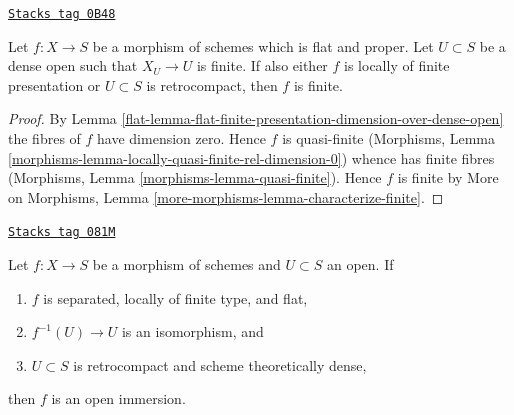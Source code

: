 \begin{lemma}
\label{flat-lemma-proper-flat-finite-over-dense-open}
\href{https://stacks.math.columbia.edu/tag/0B48}{\texttt{Stacks tag 0B48}}

Let $f : X \to S$ be a morphism of schemes which is flat and proper.
Let $U \subset S$ be a dense open such that $X_U \to U$ is finite.
If also either $f$ is locally of finite presentation or
$U \subset S$ is retrocompact, then $f$ is finite.
\end{lemma}

\begin{proof}

By Lemma \ref{flat-lemma-flat-finite-presentation-dimension-over-dense-open}
the fibres of $f$ have dimension zero.
Hence $f$ is quasi-finite
(Morphisms, Lemma \ref{morphisms-lemma-locally-quasi-finite-rel-dimension-0})
whence has finite fibres
(Morphisms, Lemma \ref{morphisms-lemma-quasi-finite}).
Hence $f$ is finite by
More on Morphisms, Lemma \ref{more-morphisms-lemma-characterize-finite}.
\end{proof}

\begin{lemma}[Zariski]
\label{flat-lemma-zariski}
\href{https://stacks.math.columbia.edu/tag/081M}{\texttt{Stacks tag 081M}}

Let $f : X \to S$ be a morphism of schemes and $U \subset S$ an open. If
\begin{enumerate}
\item $f$ is separated, locally of finite type, and flat,
\item $f^{-1}(U) \to U$ is an isomorphism, and
\item $U \subset S$ is retrocompact and scheme theoretically dense,
\end{enumerate}
then $f$ is an open immersion.
\end{lemma}

